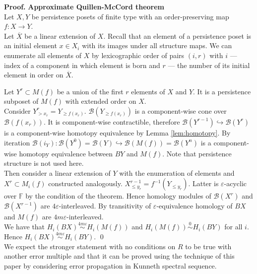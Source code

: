 \documentclass[english,12pt]{article}
\numberwithin{equation}{section}
\theoremstyle{definition}
\theoremstyle{remark}
\newenvironment{pf}{\noindent\textbf{Proof.}}{\qed}
\renewcommand{\leq}{\leqslant}
\renewcommand{\geq}{\geqslant}
\begin{document}
\begin{pf} \textbf{Approximate Quillen-McCord theorem}\\
  Let $X, Y$ be persistence posets of finite type with an order-preserving map $f : X \to Y$.\\

  Let $\overline{X}$ be a linear extension of $X$. Recall that an element of a persistence poset is an initial element $x \in X_i$ with its images under all structure maps. We can enumerate all elements of $X$ by lexicographic order of pairs $(i,r)$ with $i$ --- index of a component in which element is born and $r$ --- the number of its initial element in order on $\overline{X}$.

  Let $Y^r \subset M(f)$ be a union of the first $r$ elements of $X$ and $Y$. It is a persistence subposet of $M(f)$ with extended order on $X$.\\

  Consider $Y^r_{>x_r} = Y_{\geq f(x_r)}$. $\mathcal{B}(Y_{\geq f(x_r)})$ is a component-wise cone over $\mathcal{B}(f(x_r))$. It is component-wise contractible, therefore $\mathcal{B}(Y^{r-1}) \hookrightarrow \mathcal{B}(Y^{r})$ is a component-wise homotopy equivalence by Lemma \ref{lem:homotopy}. By iteration $\mathcal{B}(i_Y) : \mathcal{B}(Y^{0}) = \mathcal{B}(Y) \hookrightarrow \mathcal{B}(M(f)) = \mathcal{B}(Y^n)$ is a component-wise homotopy equivalence between $BY$ and $M(f)$. Note that persistence structure is not used here.\\

  Then consider a linear extension of $Y$ with the enumeration of elements and $X^r \subset M_i(f)$ constructed analogously. $X^{r-1}_{\leq y_r} = f^{-1}(Y_{\leqslant y_r})$. Latter is $\varepsilon$-acyclic over $\mathbb{F}$ by the condition of the theorem. Hence homology modules of $\mathcal{B}(X^{r})$ and $\mathcal{B}(X^{r-1})$ are $4\varepsilon$-interleaved. By transitivity of $\varepsilon$-equivalence homology of $BX$ and $M(f)$ are $4m\varepsilon$-interleaved.\\

  We have that $H_i(BX) \stackrel{4m\varepsilon}{\sim} H_i(M(f))$ and $H_i(M(f)) \stackrel{0}{\sim} H_i(BY)$ for all $i$. Hence $H_i(BX) \stackrel{4m\varepsilon}{\sim} H_i(BY)$.
\end{pf}\\

We expect the stronger statement with no conditions on $R$ to be true with another error multiple and that it can be proved using the technique of this paper by considering error propagation in Kunneth spectral sequence.
\end{document}
